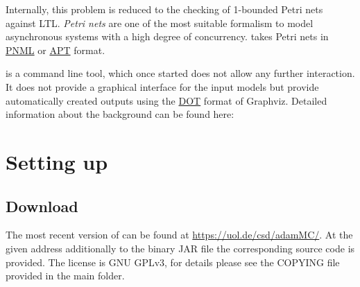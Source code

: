 \documentclass[12pt,twoside,a4paper,openright]{memoir}
\begin{document}
Internally, this problem is reduced to the checking of 1-bounded Petri nets against LTL.
\emph{Petri nets} are one of the most suitable formalism to model asynchronous systems
with a high degree of concurrency. \tool{} takes Petri nets in \href{http://www.pnml.org/}{PNML}
or \href{https://github.com/CvO-Theory/apt/}{APT} format.

\tool{} is a command line tool,
which once started does not allow any further interaction.
It does not provide a graphical interface for the input models
but provide automatically created outputs using the \href{http://www.graphviz.org/}{DOT}
format of Graphviz. Detailed information about the background can be found here:

\vspace*{10mm}
\noindent
{}

\vspace*{5mm}
\noindent
{}

\chapter{Setting up \tool}
\section{Download}
The most recent version of \tool{} can be found at \href{https://uol.de/csd/adammc/}{https://uol.de/csd/adamMC/}.
At the given address additionally to the binary JAR file the corresponding source code is provided.
The license is GNU GPLv3, for details please see the COPYING file provided in the main folder.
\end{document}
